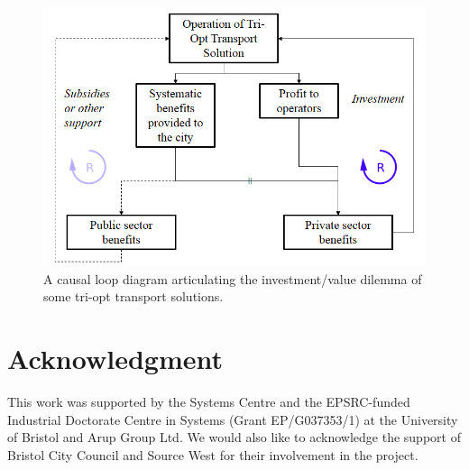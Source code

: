 \documentclass[journal]{IEEEtran}
\begin{document}
\begin{figure}[htb]
\centering
\includegraphics[width=\columnwidth]{images/causalloop.png}
\caption{A causal loop diagram articulating the investment/value
  dilemma of some tri-opt transport solutions.}
\label{fig:causalloop}
\end{figure}

\section*{Acknowledgment}

This work was supported by the Systems Centre and the EPSRC-funded
Industrial Doctorate Centre in Systems (Grant EP/G037353/1) at the
University of Bristol and Arup Group Ltd. We would also like to
acknowledge the support of Bristol City Council and Source West for
their involvement in the project.



\ifCLASSOPTIONcaptionsoff
  \newpage
\fi







%
\end{document}
